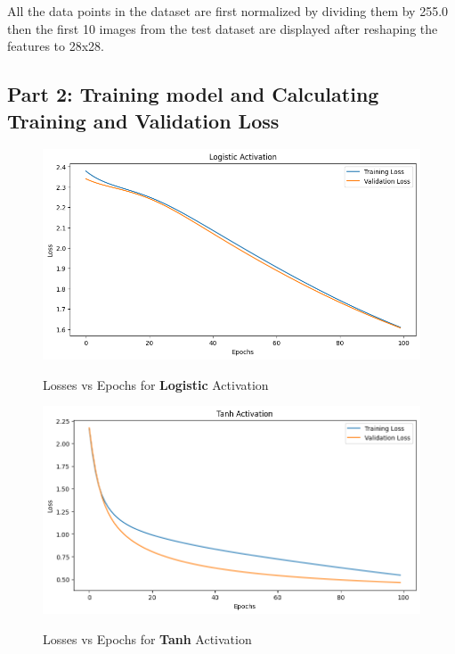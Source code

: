 \documentclass{article}
\begin{document}
All the data points in the dataset are first normalized by dividing them by 255.0 then the first 10 images from the test dataset are displayed after reshaping the features to 28x28.

\subsection*{Part 2: Training model and Calculating Training and Validation Loss}
\begin{figure}[H] %
    \centering
    \begin{minipage}{0.49\linewidth}
        \centering
        \includegraphics[width=\linewidth]{assets/2-logistic.png}
        \caption{Losses vs Epochs for \textbf{Logistic} Activation}{}
        \label{fig:b-1}
    \end{minipage}
    \hfill
    \begin{minipage}{0.49\linewidth}
        \centering
        \includegraphics[width=\linewidth]{assets/2-tanh.png}
        \caption{Losses vs Epochs for \textbf{Tanh} Activation}{}
        \label{fig:b-2}
    \end{minipage}
\end{figure}
\end{document}
